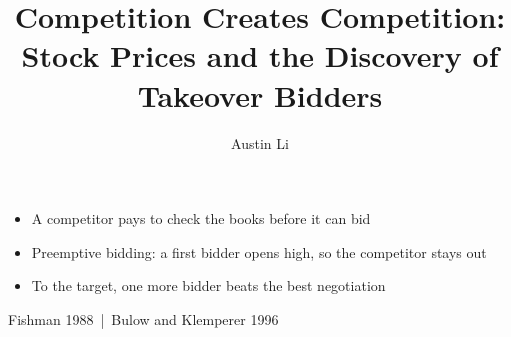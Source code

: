 \documentclass[10pt,aspectratio=169]{beamer}
\title[Competition Creates Competition]{Competition Creates Competition:\texorpdfstring{\\[2pt]}{ }%
Stock Prices and the Discovery of Takeover Bidders}
\author{Austin Li}
\institute{Department of Economics\\University College London}
\date{}
\newcommand{\GrayLine}[1]{\par{\color{cGrayText}\footnotesize #1\par}}
\begin{document}
{
\begin{frame}[plain,noframenumbering,label=F0]
\titlepage
\end{frame}}

\begin{frame}[label=Q1]
\vfill
\begin{center}
\begin{minipage}{0.94\textwidth}\centering
{\Large{}\par}
\end{minipage}
\end{center}
\vspace{1.4em}
\begin{itemize}\setlength{\itemsep}{6pt}
\item A competitor pays to check the books before it can bid
\item Preemptive bidding: a first bidder opens high, so the competitor stays out
\item To the target, one more bidder beats the best negotiation
\end{itemize}
\vfill
\GrayLine{Fishman 1988 \,|\, Bulow and Klemperer 1996}
\end{frame}
\end{document}
